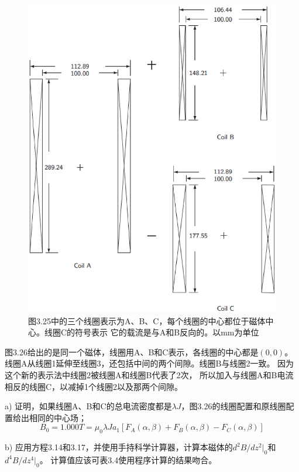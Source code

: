 \begin{figure}[htbp]
	\centering
	\includegraphics[scale=0.7]{chpt3/figs/fig3.26.eps}
	\caption{图3.25中的三个线圈表示为A、B、C，每个线圈的中心都位于磁体中心。线圈C的符号表示
		它的载流是与A和B反向的。以mm为单位}
\end{figure}
图3.26给出的是同一个磁体，线圈用A、B和C表示，各线圈的中心都是$(0,0)$。
线圈A从线圈1延伸至线圈3，还包括中间的两个间隙。线圈B与线圈2一致。
因为这个新的表示法中线圈2被线圈A和线圈B代表了2次，
所以加入与线圈A和B电流相反的线圈C，以减掉1个线圈2以及那两个间隙。

a) 证明，如果线圈A、B和C的总电流密度都是$\lambda J$，图3.26的线圈配置和原线圈配置给出相同的中心场；
\begin{equation} %
B_0 = 1.000 T=\mu_0\lambda J a_1[F_A(\alpha,\beta)+F_B(\alpha,\beta)-F_C(\alpha,\beta)]
\end{equation}

b) 应用方程3.14和3.17，并使用手持科学计算器，计算本磁体的$d^2B/dz^2|_0$和$d^4B/dz^4|_0$。
计算值应该可表3.4使用程序计算的结果吻合。

